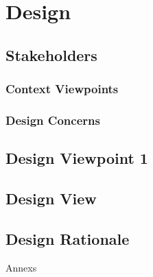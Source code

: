 \documentclass{article}
\begin{document}
\section{Design}

\subsection{Stakeholders}
\subsubsection{Context Viewpoints}
\subsubsection{Design Concerns}

\subsection{Design Viewpoint 1}
\subsection{Design View}

\subsection{Design Rationale}

Annexs
\end{document}
